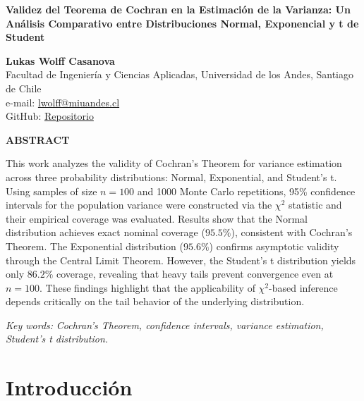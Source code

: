 \documentclass[11pt]{article}
\begin{document}
    \begin{center}

    \vspace*{1cm}

    \textbf{\Large Validez del Teorema de Cochran en la Estimación de la Varianza: 
    Un Análisis Comparativo entre Distribuciones Normal, Exponencial y t de Student}

    \vspace{1cm}

    \textbf{Lukas Wolff Casanova}\\
    Facultad de Ingeniería y Ciencias Aplicadas, Universidad de los Andes, Santiago de Chile\\
    e-mail: \href{mailto:lwolff@miuandes.cl}{lwolff@miuandes.cl}\\
    GitHub: \href{https://github.com/LukasWolff2002/TAREA_1_Estadistica_y_Dise-o}{Repositorio}
    \vspace{1cm}

    \textbf{ABSTRACT}
    \end{center}
    \vspace{0.5cm}

    This work analyzes the validity of Cochran's Theorem for variance estimation 
    across three probability distributions: Normal, Exponential, and Student's t. 
    Using samples of size $n=100$ and 1000 Monte Carlo repetitions, 95\% confidence 
    intervals for the population variance were constructed via the $\chi^2$ statistic 
    and their empirical coverage was evaluated. Results show that the Normal 
    distribution achieves exact nominal coverage ($95.5\%$), consistent with 
    Cochran's Theorem. The Exponential distribution ($95.6\%$) confirms asymptotic 
    validity through the Central Limit Theorem. However, the Student's t distribution 
    yields only $86.2\%$ coverage, revealing that heavy tails prevent convergence 
    even at $n=100$. These findings highlight that the applicability of $\chi^2$-based 
    inference depends critically on the tail behavior of the underlying distribution.

    \vspace{0.5cm}

    \textit{Key words:} \textit{Cochran's Theorem, confidence intervals, variance 
    estimation, Student's t distribution.}


\section{Introducción}
\end{document}
